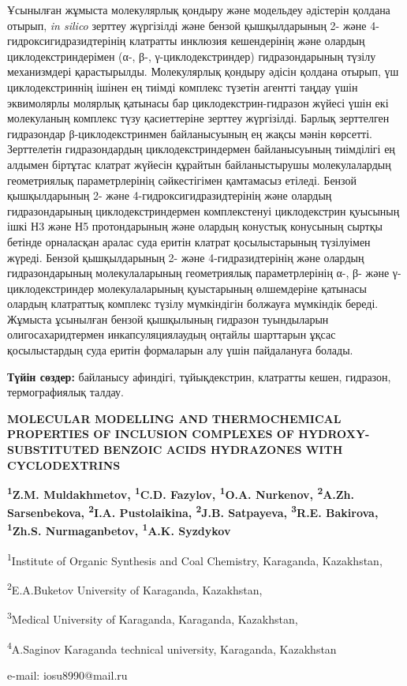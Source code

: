 Ұсынылған жұмыста молекулярлық қондыру және модельдеу әдістерін қолдана
отырып, \emph{in silico} зерттеу жүргізілді және бензой қышқылдарының 2-
және 4-гидроксигидразидтерінің клатратты инклюзия кешендерінің және
олардың циклодекстриндерімен (α-, β-, γ-циклодекстриндер)
гидразондарының түзілу механизмдері қарастырылды. Молекулярлық қондыру
әдісін қолдана отырып, үш циклодекстриннің ішінен ең тиімді комплекс
түзетін агентті таңдау үшін эквимолярлы молярлық қатынасы бар
циклодекстрин-гидразон жүйесі үшін екі молекуланың комплекс түзу
қасиеттеріне зерттеу жүргізілді. Барлық зерттелген гидразондар
β-циклодекстринмен байланысуының ең жақсы мәнін көрсетті. Зерттелетін
гидразондардың циклодекстриндермен байланысуының тиімділігі ең алдымен
біртұтас клатрат жүйесін құрайтын байланыстырушы молекулалардың
геометриялық параметрлерінің сәйкестігімен қамтамасыз етіледі. Бензой
қышқылдарының 2- және 4-гидроксигидразид\-терінің және олардың
гидразондарының циклодекстриндермен комплекстенуі циклодекстрин қуысының
ішкі Н3 және Н5 протондарының және олардың конустық конусының сыртқы
бетінде орналасқан аралас суда еритін клатрат қосылыстарының түзілуімен
жүреді. Бензой қышқылдарының 2- және 4-гидразидтерінің және олардың
гидразондарының молекулаларының геометриялық параметрлерінің α-, β- және
γ-циклодекстриндер молекулаларының қуыстарының өлшемдеріне қатынасы
олардың клатраттық комплекс түзілу мүмкіндігін болжауға мүмкіндік
береді. Жұмыста ұсынылған бензой қышқылының гидразон туындыларын
олигосахаридтермен инкапсуляциялаудың оңтайлы шарттарын ұқсас
қосылыстардың суда еритін формаларын алу үшін пайдалануға болады.

{\bfseries Түйін сөздер:} байланысу афиндігі, тұйықдекстрин, клатратты
кешен, гидразон, термографиялық талдау.

\begin{articleheader}
{\bfseries MOLECULAR MODELLING AND THERMOCHEMICAL PROPERTIES OF INCLUSION COMPLEXES OF HYDROXY-SUBSTITUTED BENZOIC ACIDS HYDRAZONES WITH CYCLODEXTRINS}

{\bfseries
\textsuperscript{1}Z.M. Muldakhmetov,
\textsuperscript{1}C.D. Fazylov\textsuperscript{\envelope },
\textsuperscript{1}O.A. Nurkenov,
\textsuperscript{2}A.Zh. Sarsenbekova,
\textsuperscript{2}I.A. Pustolaikina,
\textsuperscript{2}J.B. Satpayeva,
\textsuperscript{3}R.E. Bakirova,
\textsuperscript{1}Zh.S. Nurmaganbetov,
\textsuperscript{1}A.K. Syzdykov
}
\end{articleheader}

\begin{affiliation}
\textsuperscript{1}Institute of Organic Synthesis and Coal Chemistry, Karaganda, Kazakhstan,

\textsuperscript{2}E.A.Buketov University of Karaganda, Kazakhstan,

\textsuperscript{3}Medical University of Karaganda, Karaganda, Kazakhstan,

\textsuperscript{4}A.Saginov Karaganda technical university, Karaganda, Kazakhstan

e-mail: iosu8990@mail.ru
\end{affiliation}

